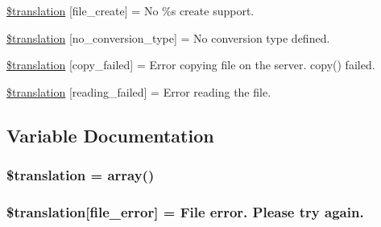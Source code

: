 \begin{DoxyCompactItemize}
\hyperlink{class_8upload_8xx___x_x_8php_a1ecb4673e4fb69e06b3f20b65cecf30a}{\$translation} \mbox{[}\textquotesingle{}file\+\_\+create\textquotesingle{}\mbox{]} = \textquotesingle{}No \%s create support.\textquotesingle{}
\item 
\hyperlink{class_8upload_8xx___x_x_8php_a4712d7ec28e9a7f17eb3338af2358363}{\$translation} \mbox{[}\textquotesingle{}no\+\_\+conversion\+\_\+type\textquotesingle{}\mbox{]} = \textquotesingle{}No conversion type defined.\textquotesingle{}
\item 
\hyperlink{class_8upload_8xx___x_x_8php_a783c9358bcf54a054545b50098bc679b}{\$translation} \mbox{[}\textquotesingle{}copy\+\_\+failed\textquotesingle{}\mbox{]} = \textquotesingle{}Error copying file on the server. copy() failed.\textquotesingle{}
\item 
\hyperlink{class_8upload_8xx___x_x_8php_a01bea14c9fd5f353f62db44beabfcd42}{\$translation} \mbox{[}\textquotesingle{}reading\+\_\+failed\textquotesingle{}\mbox{]} = \textquotesingle{}Error reading the file.\textquotesingle{}
\end{DoxyCompactItemize}


\subsection{Variable Documentation}
\hypertarget{class_8upload_8xx___x_x_8php_a1f198d410fecc3871ebdd468d343a5e3}{}
\subsubsection[{\$translation}]{\setlength{\rightskip}{0pt plus 5cm}\$translation = array()}\label{class_8upload_8xx___x_x_8php_a1f198d410fecc3871ebdd468d343a5e3}
\hypertarget{class_8upload_8xx___x_x_8php_ac7498e49b9771b04698029aa61c70821}{}
\subsubsection[{\$translation}]{\setlength{\rightskip}{0pt plus 5cm}\$translation\mbox{[}\textquotesingle{}file\+\_\+error\textquotesingle{}\mbox{]} = \textquotesingle{}File error. Please try again.\textquotesingle{}}\label{class_8upload_8xx___x_x_8php_ac7498e49b9771b04698029aa61c70821}
\hypertarget{class_8upload_8xx___x_x_8php_a6ec3d3a47ab70d77e7aa593e82ead10e}{}
